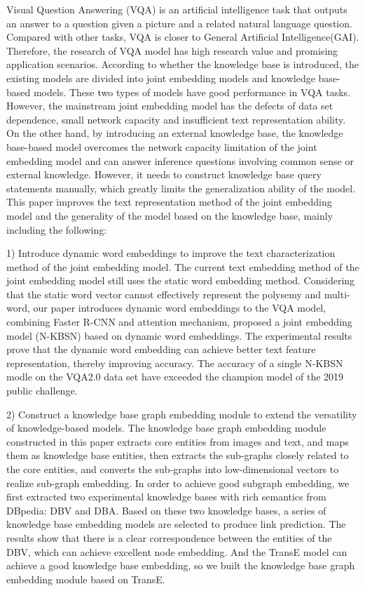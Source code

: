 
\begin{englishabstract}
Visual Question Answering (VQA) is an artificial intelligence task that outputs an answer to a question given a picture and a related natural language question. Compared with other tasks, VQA is closer to General Artificial Intelligence(GAI). Therefore, the research of VQA model has high research value and promising application scenarios. According to whether the knowledge base is introduced, the existing models are divided into joint embedding models and knowledge base-based models. These two types of models have good performance in VQA tasks. However, the mainstream joint embedding model has the defects of data set dependence, small network capacity and insufficient text representation ability. On the other hand, by introducing an external knowledge base, the knowledge base-based model overcomes the network capacity limitation of the joint embedding model and can answer inference questions involving common sense or external knowledge. However, it needs to construct knowledge base query statements manually, which greatly limits the generalization ability of the model. This paper improves the text representation method of the joint embedding model and the generality of the model based on the knowledge base, mainly including the following:

1) Introduce dynamic word embeddings to improve the text characterization method of the joint embedding model. The current text embedding method of the joint embedding model still uses the static word embedding method. Considering that the static word vector cannot effectively represent the polysemy and multi-word, our paper introduces dynamic word embeddings to the VQA model, combining Faster R-CNN and attention mechanism, proposed a joint embedding model (N-KBSN) based on dynamic word embeddings. The experimental results prove that the dynamic word embedding can achieve better text feature representation, thereby improving accuracy. The accuracy of a single N-KBSN modle on the VQA2.0 data set have exceeded the champion model of the 2019 public challenge.

2) Construct a knowledge base graph embedding module to extend the versatility of knowledge-based models. The knowledge base graph embedding module constructed in this paper extracts core entities from images and text, and maps them as knowledge base entities, then extracts the sub-graphs closely related to the core entities, and converts the sub-graphs into low-dimensional vectors to realize sub-graph embedding. In order to achieve good subgraph embedding, we first extracted two experimental knowledge bases with rich semantics from DBpedia: DBV and DBA. Based on these two knowledge bases, a series of knowledge base embedding models are selected to produce link prediction. The results show that there is a clear correspondence between the entities of the DBV, which can achieve excellent node embedding. And the TransE model can achieve a good knowledge base embedding, so we built the knowledge base graph embedding module based on TransE.


\end{englishabstract}
